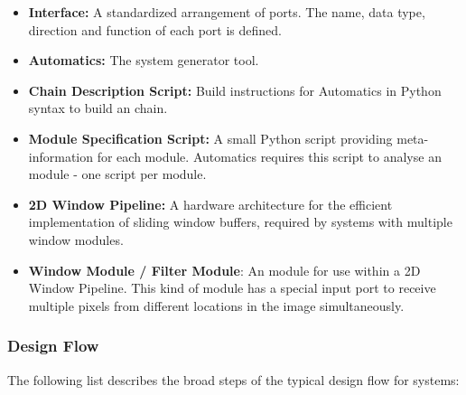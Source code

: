 \begin{itemize}
\item \textbf{Interface:} A standardized arrangement of ports. The name, data type, direction and function of each port is defined.
\item \textbf{Automatics:} The \asterics system generator tool.
\item \textbf{Chain Description Script:} Build instructions for Automatics in Python syntax to build an \asterics chain.
\item \textbf{Module Specification Script:} A small Python script providing meta-information for each \asterics module.
Automatics requires this script to analyse an \asterics module - one script per module.
\item \textbf{2D Window Pipeline:} A hardware architecture for the efficient implementation of sliding window buffers, required by systems with multiple window modules.
\item \textbf{Window Module / Filter Module}: An \asterics module for use within a 2D Window Pipeline.
This kind of module has a special input port to receive multiple pixels from different locations in the image simultaneously.
\end{itemize}

\subsubsection*{\asterics Design Flow}
The following list describes the broad steps of the typical design flow for \asterics systems:

